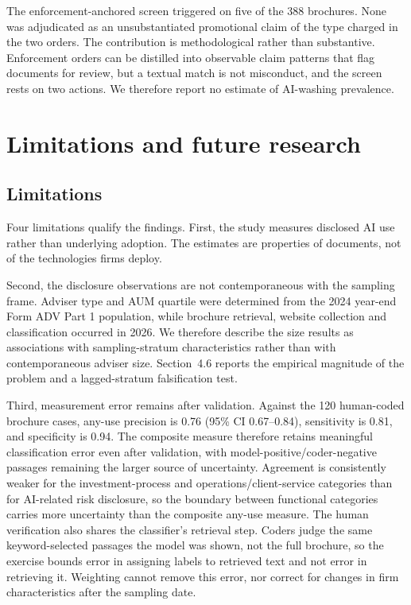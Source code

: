 \documentclass[utf8]{FrontiersinHarvard}
\begin{document}
The enforcement-anchored screen triggered on five of the 388 brochures. None was adjudicated as an unsubstantiated promotional claim of the type charged in the two orders. The contribution is methodological rather than substantive. Enforcement orders can be distilled into observable claim patterns that flag documents for review, but a textual match is not misconduct, and the screen rests on two actions. We therefore report no estimate of AI-washing prevalence.

\section{Limitations and future research}

\subsection{Limitations}

Four limitations qualify the findings. First, the study measures disclosed AI use rather than underlying adoption. The estimates are properties of documents, not of the technologies firms deploy.

Second, the disclosure observations are not contemporaneous with the sampling frame. Adviser type and AUM quartile were determined from the 2024 year-end Form ADV Part 1 population, while brochure retrieval, website collection and classification occurred in 2026. We therefore describe the size results as associations with sampling-stratum characteristics rather than with contemporaneous adviser size. Section~4.6 reports the empirical magnitude of the problem and a lagged-stratum falsification test.

Third, measurement error remains after validation. Against the 120 human-coded brochure cases, any-use precision is 0.76 (95\% CI 0.67--0.84), sensitivity is 0.81, and specificity is 0.94. The composite measure therefore retains meaningful classification error even after validation, with model-positive/coder-negative passages remaining the
larger source of uncertainty. Agreement is consistently weaker for the investment-process and operations/client-service categories than for AI-related risk disclosure, so the boundary between functional categories carries more uncertainty than the composite any-use measure. The human verification also shares the classifier's retrieval step. Coders judge the same keyword-selected passages the model was shown, not the full brochure, so the exercise bounds error in assigning labels to retrieved text and not error in retrieving it. Weighting cannot remove this error, nor correct for changes in firm characteristics after the sampling date.
\end{document}
